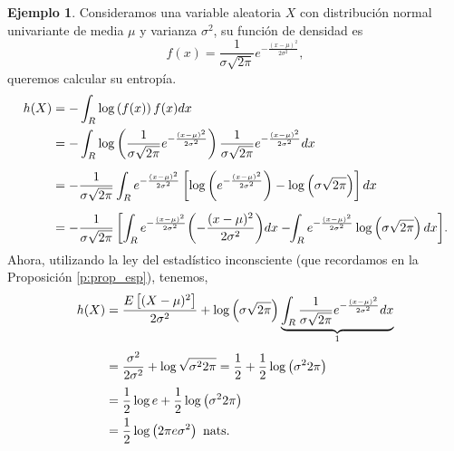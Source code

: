 \documentclass[12pt,a4paper]{report} %
\let\mathbb\relax
\theoremstyle{definition}
\newtheorem{example}[theorem]{Ejemplo}
\begin{document}
\begin{example}\label{ej:norm_uni}
  Consideramos una variable aleatoria $X$ con distribución normal univariante de media $\mu$ y varianza $\sigma^2$, su función de densidad es\[ f(x) = \frac{1}{\sigma \sqrt{2\pi}} e ^{-\frac{(x-\mu)^2}{2\sigma ^2}},\] queremos calcular su entropía.
  \begin{align*}
    h(X) &= - \int_{\mathbb{R}} \log \left(f(x)\right) f(x)  dx\\ &= - \int_{\mathbb{R}}  \log \left ( \frac{1}{\sigma \sqrt{2\pi}} e ^{-\frac{(x-\mu)^2}{2\sigma ^2}} \right ) \frac{1}{\sigma \sqrt{2\pi}} e ^{-\frac{(x-\mu)^2}{2\sigma ^2}}dx\\[5pt]
    &= -  \frac{1}{\sigma \sqrt{2\pi}} \int_{\mathbb{R}} e ^{-\frac{(x-\mu)^2}{2\sigma ^2}} \left [ \log \left ( e ^{-\frac{(x-\mu)^2}{2\sigma ^2}} \right ) - \log \left(\sigma \sqrt{2\pi}\right ) \right ] dx\\[5pt]
    &= -  \frac{1}{\sigma \sqrt{2\pi}}\left [ \int_{\mathbb{R}} e ^{-\frac{(x-\mu)^2}{2\sigma ^2}}\! \left ( -\frac{(x-\mu)^2}{2\sigma ^2} \right )\!dx -\!\!\int_{\mathbb{R}} e ^{-\frac{(x-\mu)^2}{2\sigma ^2}} \log \left ( \sigma \sqrt{2\pi}\right ) dx \right]\!.\\[-5pt]
  \end{align*}

  Ahora, utilizando la ley del estadístico inconsciente (que recordamos en la Proposición \ref{p:prop_esp}), tenemos,
  \begingroup
\allowdisplaybreaks
  \begin{align*}
    h(X) &= \frac{\mathbb{E}\left [ (X-\mu) ^2\right ] }{2\sigma^2} + \log\left( \sigma\sqrt{2\pi} \right )\underbrace{\int_{\mathbb{R}} \frac{1}{\sigma\sqrt{2\pi}}e ^{-\frac{(x-\mu)^2}{2\sigma ^2}}dx}_{1}\\[3pt]
    &= \frac{\sigma^2}{2\sigma^2} + \log \sqrt{\sigma^2 2 \pi} = \frac{1}{2} + \frac{1}{2}\log\left(  \sigma^2 2 \pi\right)\\[3pt]
    &= \frac{1}{2} \log e + \frac{1}{2} \log\left( \sigma^2 2 \pi\right)\\ &= \frac{1}{2}\log\left({2\pi e\sigma^2} \right) \text{ nats.}\\
  \end{align*}
  \endgroup
  
\end{example}
\end{document}
